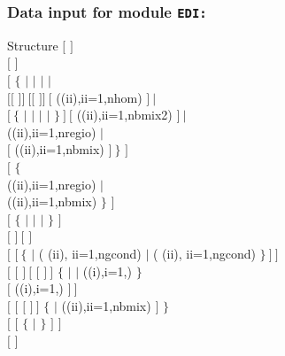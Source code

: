 \clearpage

\subsubsection{Data input for module {\tt EDI:}}\label{sect:descedi}

\begin{DataStructure}{Structure }
$[$   $]$ \\
$[$  $]$ \\
$[$  $\{$  $|$  $|$  $|$  $|$ \\
\hskip 0.8cm   $[[$      $]]~[[$        $]]~[$  ((ii),ii=1,nhom) $]~|$ \\
\hskip 0.8cm  $[~\{$  $|$  $|$  $|$  $|$  $\}~]~[$  ((ii),ii=1,nbmix2) $]~|$ \\
\hskip 0.8cm  ((ii),ii=1,nregio) $|$ \\
\hskip 0.8cm  $[$ ((ii),ii=1,nbmix) $]~\}$ $]$ \\
$[$  $\{$ \\
\hskip 0.8cm  ((ii),ii=1,nregio) $|$ \\
\hskip 0.8cm  ((ii),ii=1,nbmix) $\}$ $]$  \\
$[$ $\{$  $|$  $|$  $|$  $\}$ $]$ \\
$[$  $]~[$  $]$ \\
$[$  $[~\{$   $|$ ( (ii), ii=1,ngcond) $|$ ( (ii), ii=1,ngcond) $\}~]~]$\\
$[$  $[$  $]~[$  $[$  $]~]$ $\{$  $|$  $|$ 
   ((i),i=1,) $\}$\\
\hskip 0.8cm $[$   ((i),i=1,) $]~]$\\
$[$  $[$  $[$  $]~]$ $\{$  $|$ ((ii),ii=1,nbmix) $]$ $\}$\\ 
$[$  $[$  $\{$  $|$  $\}$ $]$ $]$ \\
$[$  $]$ \\

\end{DataStructure}
